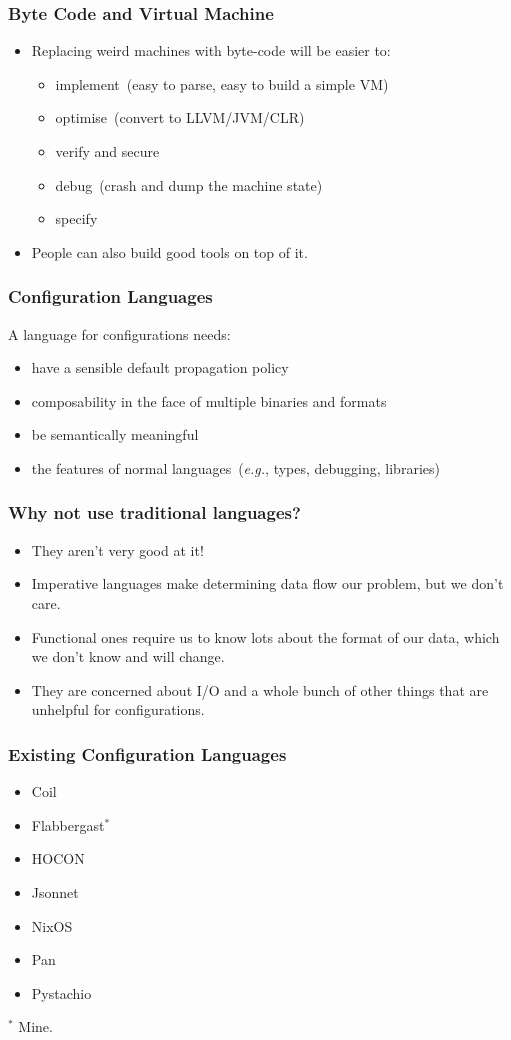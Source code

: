 \documentclass{beamer}
\begin{document}
\begin{frame}\frametitle{Byte Code and Virtual Machine}
\begin{itemize}
\item Replacing weird machines with byte-code will be easier to:
\begin{itemize}
\item implement~(easy to parse, easy to build a simple VM)
\item optimise~(convert to LLVM/JVM/CLR)
\item verify and secure
\item debug~(crash and dump the machine state)
\item specify
\end{itemize}
\item People can also build good tools on top of it.
\end{itemize}
\end{frame}


\begin{frame}\frametitle{Configuration Languages}
A language for configurations needs:
\begin{itemize}
\item have a sensible default propagation policy
\item composability in the face of multiple binaries and formats
\item be semantically meaningful
\item the features of normal languages~(\emph{e.g.}, types, debugging, libraries)
\end{itemize}
\end{frame}

\begin{frame}\frametitle{Why not use traditional languages?}
\begin{itemize}
\item They aren't very good at it!
\item Imperative languages make determining data flow our problem, but we don't care.
\item Functional ones require us to know lots about the format of our data, which we don't know and will change.
\item They are concerned about I/O and a whole bunch of other things that are unhelpful for configurations.
\end{itemize}
\end{frame}

\begin{frame}\frametitle{Existing Configuration Languages}
\begin{itemize}
\item Coil
\item Flabbergast$^*$
\item HOCON
\item Jsonnet
\item NixOS
\item Pan
\item Pystachio
\end{itemize}
$^*$ Mine.
\end{frame}
\end{document}
